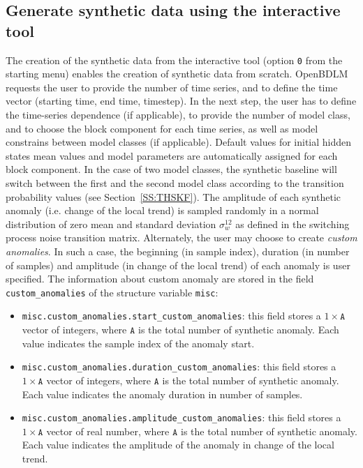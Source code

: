 \subsection{Generate synthetic data using the interactive tool}
The creation of the synthetic data from the interactive tool (option \colorbox{light-gray}{\lstinline[basicstyle = \mlttfamily \small, backgroundcolor = \color{light-gray}]!0!} from the starting menu) enables the creation of synthetic data from scratch. 
OpenBDLM requests the user to provide the number of time series, and to define the time vector (starting time, end time, timestep).
In the next step, the user has to define the time-series dependence (if applicable), to provide the number of model class, and to choose the block component for each time series, as well as model constrains between model classes (if applicable).
Default values for initial hidden states mean values and model parameters are automatically assigned for each block component.
In the case of two model classes, the synthetic baseline will switch between the first and the second model class according to the transition probability values (see Section~\ref{SS:THSKF}).
The amplitude of each synthetic anomaly (i.e. change of the local trend) is sampled randomly in a normal distribution of zero mean and standard deviation $\sigma_{w}^{12}$ as defined in the switching process noise transition matrix.
Alternately, the user may choose to create \emph{custom anomalies}.
In such a case, the beginning (in sample index), duration (in number of samples) and amplitude (in change of the local trend) of each anomaly is user specified.
The information about custom anomaly are stored in the field \lstinline[basicstyle = \mlttfamily \small, backgroundcolor = \color{light-gray}]!custom_anomalies! of the structure variable \lstinline[basicstyle = \mlttfamily \small, backgroundcolor = \color{light-gray}]!misc!:
\begin{itemize}
\item \lstinline[basicstyle = \mlttfamily \small, backgroundcolor = \color{light-gray}]!misc.custom_anomalies.start_custom_anomalies!: this field stores a $1\times \mathtt{A}$ vector of integers, where $\mathtt{A}$ is the total number of synthetic anomaly. Each value indicates the sample index of the anomaly start.
\item \lstinline[basicstyle = \mlttfamily \small, backgroundcolor = \color{light-gray}]!misc.custom_anomalies.duration_custom_anomalies!: this field stores a $1\times \mathtt{A}$ vector of integers, where $\mathtt{A}$ is the total number of synthetic anomaly. Each value indicates the anomaly duration in number of samples.
\item \lstinline[basicstyle = \mlttfamily \small, backgroundcolor = \color{light-gray}]!misc.custom_anomalies.amplitude_custom_anomalies!: this field stores a $1\times \mathtt{A}$ vector of real number, where $\mathtt{A}$ is the total number of synthetic anomaly. Each value indicates the amplitude of the anomaly in change of the local trend.
\end{itemize}
